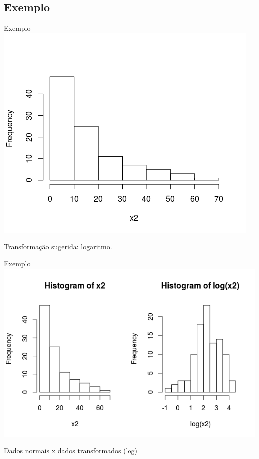 \documentclass{beamer}
\begin{document}
\subsection{Exemplo}

\begin{frame}{Exemplo}
  \centering
  \includegraphics[width=.8\textwidth]{Cap37-38/lognormal1-h}

Transformação sugerida: logaritmo.
\end{frame}

\begin{frame}{Exemplo}
  \centering
  \includegraphics[width=\textwidth]{Cap37-38/transf-h}

Dados normais x dados transformados (log)
\end{frame}
\end{document}
